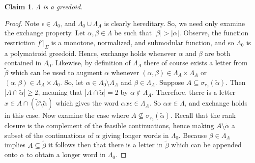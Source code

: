 \documentclass[11pt]{article}
\newtheorem*{claim}{Claim}
\newcommand{\univ}{\Sigma}
\newcommand{\glang}{\Lambda}
\begin{document}
\begin{claim}
    $\glang$ is a greedoid.
\end{claim}
\begin{proof}
    Note $\epsilon \in \glang_0$, and $\glang_0\cup \glang_A$ is clearly hereditary.
    So, we need only examine the exchange property.
    Let $\alpha,\beta \in \glang$ be such that $|\beta| > |\alpha|$.
    Observe, the function restriction $f'|_\univ$ is a monotone, normalized, and submodular function, and so $\glang_0$ is a polymatroid greedoid.
    Hence, exchange holds whenever $\alpha$ and $\beta$ are both contained in $\glang_0$.
    Likewise, by definition of $\glang_A$ there of course exists a letter from $\widetilde{\beta}$ which can be used to augment $\alpha$ whenever $(\alpha,\beta) \in \glang_A\times \glang_A$ or $(\alpha,\beta) \in \glang_A\times\glang_0$.
    So, let $\alpha \in \glang_0\setminus\glang_A$ and $\beta \in \glang_A$.
    Suppose $A\subseteq\sigma_{r_0}\left(\widetilde{\alpha}\right)$.
    Then $|A\cap\widetilde{\alpha}| \geq 2$, meaning that $|A\cap\widetilde{\alpha}| = 2$ by $\alpha \notin \glang_A$.
    Therefore, there is a letter $x \in A\cap(\widetilde{\beta}\setminus\widetilde{\alpha})$ which gives the word $\alpha x\epsilon\in\glang_A$.
    So $\alpha x \in \glang$, and exchange holds in this case.
    Now examine the case where $A\not\subseteq\sigma_{r_0}\left(\widetilde{\alpha}\right)$.
    Recall that the rank closure is the complement of the feasible continuations, hence making $A\setminus\widetilde{\alpha}$ a subset of the continuations of $\alpha$ giving longer words in $\glang_0$.
    Because $\beta \in \glang_A$ implies $A\subseteq \widetilde{\beta}$ it follows then that there is a letter in $\widetilde{\beta}$ which can be appended onto $\alpha$ to obtain a longer word in $\glang_0$.
\end{proof}
\end{document}
